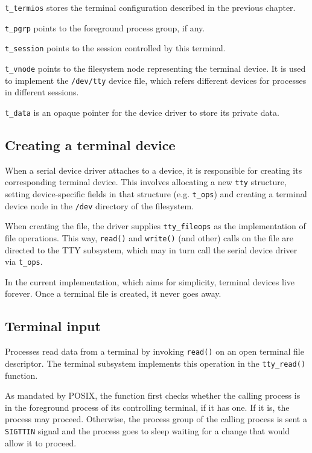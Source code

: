 \documentclass[shortabstract, manyadvisors, english, mgr]{iithesis}
\begin{document}
\texttt{t\_termios} stores the terminal configuration described in the previous
chapter.

\texttt{t\_pgrp} points to the foreground process group, if any.

\texttt{t\_session} points to the session controlled by this terminal.

\texttt{t\_vnode} points to the filesystem node representing the terminal
device. It is used to implement the \texttt{/dev/tty} device file, which refers
different devices for processes in different sessions.

\texttt{t\_data} is an opaque pointer for the device driver to store its private
data.

\subsection{Creating a terminal device}

When a serial device driver attaches to a device, it is responsible for creating
its corresponding terminal device. This involves allocating a new \texttt{tty}
structure, setting device-specific fields in that structure (e.g.
\texttt{t\_ops}) and creating a terminal device node in the \texttt{/dev}
directory of the filesystem.

When creating the file, the driver supplies \texttt{tty\_fileops} as the
implementation of file operations. This way, \texttt{read()} and
\texttt{write()} (and other) calls on the file are directed to the TTY
subsystem, which may in turn call the serial device driver via \texttt{t\_ops}.

In the current implementation, which aims for simplicity, terminal devices live
forever. Once a terminal file is created, it never goes away.

\subsection{Terminal input}

Processes read data from a terminal by invoking \texttt{read()} on an open
terminal file descriptor. The terminal subsystem implements this operation in
the \texttt{tty\_read()} function.

As mandated by POSIX, the function first checks whether the calling process is
in the foreground process of its controlling terminal, if it has one. If it is,
the process may proceed. Otherwise, the process group of the calling process is
sent a \texttt{SIGTTIN} signal and the process goes to sleep waiting for a
change that would allow it to proceed.
\end{document}
